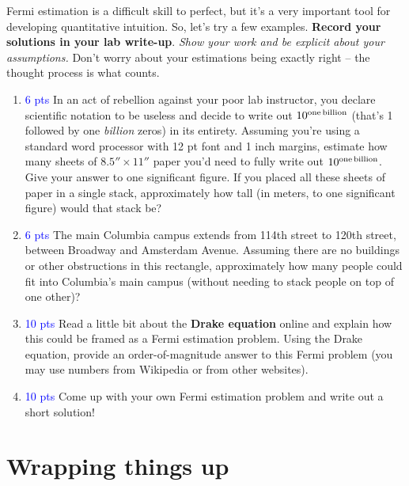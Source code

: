 \documentclass[11pt]{article}
\begin{document}
\medskip \noindent
Fermi estimation is a difficult skill to perfect, but it's a very important tool for developing quantitative intuition. So, let's try a few examples. \textbf{Record your solutions in your lab write-up}. \textit{Show your work and be explicit about your assumptions.} Don't worry about your estimations being exactly right -- the thought process is what counts.
\begin{enumerate}
    \item \textcolor{blue}{6 pts} In an act of rebellion against your poor lab instructor, you declare scientific notation to be useless and decide to write out $10^{\rm one \, billion}$ (that's 1 followed by one \emph{billion} zeros) in its entirety. Assuming you're using a standard word processor with 12 pt font and 1 inch margins, estimate how many sheets of $8.5'' \times 11''$ paper you'd need to fully write out $10^{\rm one \, billion}$. Give your answer to one significant figure. If you placed all these sheets of paper in a single stack, approximately how tall (in meters, to one significant figure) would that stack be? 
    
    \item \textcolor{blue}{6 pts} The main Columbia campus extends from 114th street to 120th street, between Broadway and Amsterdam Avenue. Assuming there are no buildings or other obstructions in this rectangle, approximately how many people could fit into Columbia's main campus (without needing to stack people on top of one other)? 
    
    \item \textcolor{blue}{10 pts} Read a little bit about the \textbf{Drake equation} online and explain how this could be framed as a Fermi estimation problem. Using the Drake equation, provide an order-of-magnitude answer to this Fermi problem (you may use numbers from Wikipedia or from other websites). 
    
    \item \textcolor{blue}{10 pts} Come up with your own Fermi estimation problem and write out a short solution!
\end{enumerate}

\section{Wrapping things up}
\end{document}

